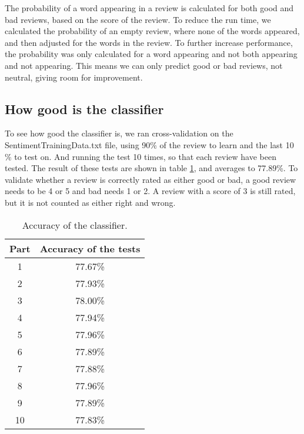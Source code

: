 The probability of a word appearing in a review is calculated for both good and bad reviews, based on the score of the review. To reduce the run time, we calculated the probability of an empty review, where none of the words appeared, and then adjusted for the words in the review. To further increase performance, the probability was only calculated for a word appearing and not both appearing and not appearing. This means we can only predict good or bad reviews, not neutral, giving room for improvement.


\subsection{How good is the classifier}
To see how good the classifier is, we ran cross-validation on the SentimentTrainingData.txt file, using 90\% of the review to learn and the last 10 \% to test on. And running the test 10 times, so that each review have been tested. The result of these tests are shown in table \ref{tab:classifier-accuracy}, and averages to 77.89\%. To validate whether a review is correctly rated as either good or bad, a good review needs to be 4 or 5 and bad needs 1 or 2. A review with a score of 3 is still rated, but it is not counted as either right and wrong.

\begin{table}[h]
    \centering
    \begin{tabular}{|c|c|}
        \hline 
        Part & Accuracy of the tests \\ 
        \hline 
        1 & 77.67\% \\ 
        \hline 
        2 & 77.93\% \\ 
        \hline 
        3 & 78.00\% \\ 
        \hline 
        4 & 77.94\% \\ 
        \hline 
        5 & 77.96\% \\ 
        \hline 
        6 & 77.89\% \\ 
        \hline 
        7 & 77.88\% \\ 
        \hline 
        8 & 77.96\% \\ 
        \hline 
        9 & 77.89\% \\ 
        \hline 
        10 & 77.83\% \\ 
        \hline 
    \end{tabular}
    \caption{Accuracy of the classifier.}
    \label{tab:classifier-accuracy}
\end{table}